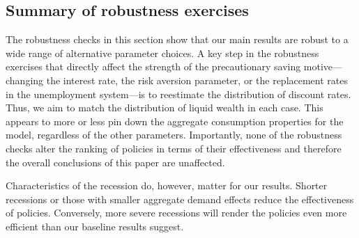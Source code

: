 \documentclass[\PathToRoot/\ProjectName]{subfiles}
\begin{document}
%
%

\hypertarget{summary-of-robustness-exercises}{}\par\subsection*{Summary of robustness exercises}
\whenintegrated{\label{sec:robust_summary}} 

The robustness checks in this section show that our main results are robust to a wide range of alternative parameter choices.
A key step in the robustness exercises that directly affect the strength of the precautionary saving motive---changing the interest rate, the risk aversion parameter, or the replacement rates in the unemployment system---is to reestimate the distribution of discount rates.
Thus, we aim to match the distribution of liquid wealth in each case.
This appears to more or less pin down the aggregate consumption properties for the model, regardless of the other parameters.
Importantly, none of the robustness checks alter the ranking of policies in terms of their effectiveness and therefore the overall conclusions of this paper are unaffected.

Characteristics of the recession do, however, matter for our results.
Shorter recessions or those with smaller aggregate demand effects reduce the effectiveness of policies.
Conversely, more severe recessions will render the policies even more efficient than our baseline results suggest.

\smartbib
\end{document}
